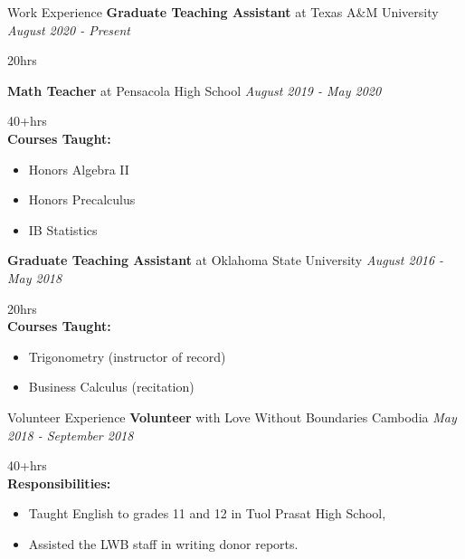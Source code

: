 \documentclass{resume} %
\begin{document}
\newpage


\begin{rSection}{Work Experience} 
{\bf Graduate Teaching Assistant } at Texas A\&M University \hfill {\em August 2020 - Present}\\
\strut\hfill{20hrs}
\vspace{2mm}

{\bf Math Teacher} at Pensacola High School \hfill {\em August 2019 - May 2020}\\
\strut\hfill{40+hrs}\\
{\bf Courses Taught:} 
\begin{itemize}
\item Honors Algebra II
\item Honors Precalculus 
\item IB Statistics
\end{itemize} 
\vspace{2mm}

{\bf Graduate Teaching Assistant} at Oklahoma State University \hfill {\em August 2016 - May 2018} \\
\strut\hfill{20hrs}\\
{\bf Courses Taught:} 
\begin{itemize}
\item Trigonometry (instructor of record)
\item Business Calculus (recitation)
\end{itemize} 

\end{rSection}

\begin{rSection}{Volunteer Experience}
{\bf Volunteer} with Love Without Boundaries Cambodia \hfill {\em May 2018 - September 2018}\\
\strut\hfill{40+hrs}\\
{\bf Responsibilities:} 
\begin{itemize}
\item Taught English to grades 11 and 12 in Tuol Prasat High School, 
\item Assisted the LWB staff in writing donor reports.
\end{itemize}
\end{rSection}
\end{document}
